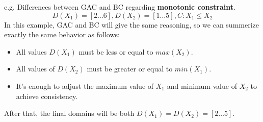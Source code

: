 \begin{example}
    e.g. Differences between GAC and BC regarding \textbf{monotonic constraint}. 
    $$ D(X_1) = [2\dots6], D(X_2) = [1\dots5], C: X_1 \leq X_2 $$
    In this example, GAC and BC will give the same reasoning, so we can summerize exactly the same behavior as follows:
    \begin{itemize}
        \renewcommand{\labelitemi}{-}
        \item All values $D(X_1)$ must be less or equal to $max(X_2)$.
        \item All values of $D(X_2)$ must be greater or equal to $min(X_1)$.
        \item It's enough to adjust the maximum value of $X_1$ and minimum value of $X_2$ to achieve consistency.
    \end{itemize} \vspace{7pt}
    After that, the final domains will be both $D(X_1) = D(X_2) = [2\dots5]$.
\end{example}